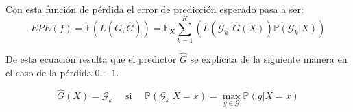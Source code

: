 \noindent Con esta función de pérdida el error de predicción esperado pasa a ser: 
\begin{equation}
EPE(f)=\mathbb{E}(L(G,\hat{G}))=\mathbb{E}_X \sum_{k=1}^K(L(\mathcal{G}_k,\hat{G}(X))\mathbb{P}(\mathcal{G}_k|X))
\end{equation}

\noindent De esta ecuación resulta que el predictor $\hat{G}$ se explicita de la siguiente manera en el caso de la pérdida $0-1$. 

\begin{equation}
\hat{G}(X)=\mathcal{G}_k \quad \text{ si } \quad \mathbb{P}(\mathcal{G}_k|X=x)=\max_{g\in\mathcal{G}}\mathbb{P}(g|X=x)
\end{equation}


